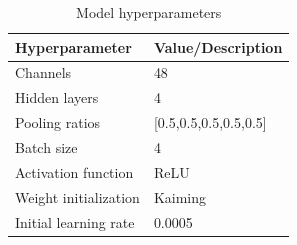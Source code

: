 \begin{table}[ht]
    \centering
    \caption{Model hyperparameters}
    \label{table:hp}
    \begin{tabular}{|l|l|}
    \hline
    \textbf{Hyperparameter}    & \textbf{Value/Description} \\
    \hline
    Channels    & 48                           \\
    \hline
    Hidden layers    & 4                          \\
    \hline
    Pooling ratios             & [0.5,0.5,0.5,0.5,0.5]                       \\
    \hline
    Batch size                 & 4                         \\
    \hline
    Activation function        & ReLU                       \\
    \hline
    Weight initialization    &  Kaiming                        \\
    \hline
    Initial learning rate       & 0.0005                       \\
    \hline
    \end{tabular}
    \end{table}
